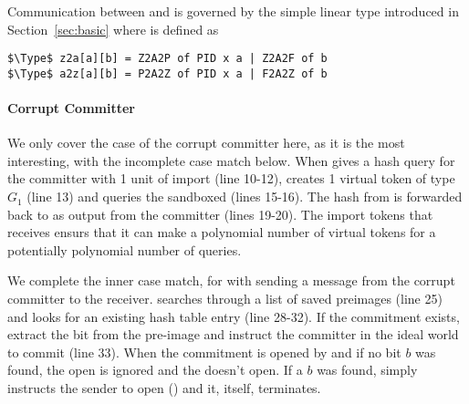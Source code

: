 Communication between \Z and \A is governed by the simple linear type \inline{comm[G][Z2A[2p][2f]} introduced in Section~\ref{sec:basic} where  is defined as 
\begin{lstlisting}[basicstyle=\footnotesize\BeraMonottFamily, mathescape]
$\Type$ z2a[a][b] = Z2A2P of PID x a | Z2A2F of b 
$\Type$ a2z[a][b] = P2A2Z of PID x a | F2A2Z of b
\end{lstlisting}

\paragraph*{\textbf{Corrupt Committer}}
We only cover the case of the corrupt committer here, as it is the most interesting, with the incomplete case match below.
When \Z gives \simcom a hash query for the committer with 1 unit of import (line 10-12), \simcom creates 1 virtual token of type $G_1$ (line 13) and queries the sandboxed \Fro (lines 15-16).  
The hash from \Fro is forwarded back to \Z as output  from the committer (lines 19-20).
The import tokens that \simcom receives ensurs that it can make a polynomial number of virtual tokens for a potentially polynomial number of queries. 

We complete the inner case match, for  with \Z sending a message from the corrupt committer to the receiver.
\simcom searches through a list of saved preimages  (line 25) and looks for an existing hash table entry (line 28-32). 
If the commitment exists, extract the bit from the pre-image and instruct the committer in the ideal world to commit (line 33).
When the commitment is opened by \Z and if no bit $b$ was found, the open is ignored and the \Fcom doesn't open.
If a $b$ was found, \simcom simply instructs the sender to open () and it, itself, terminates.  

